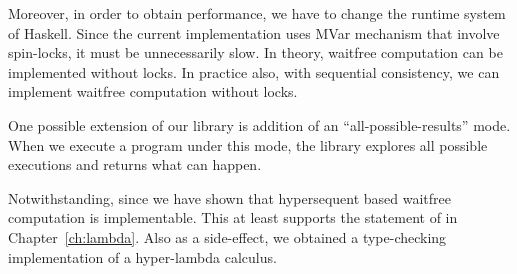 Moreover, in order to obtain performance, we have to change the runtime
system of Haskell.  Since the current implementation uses MVar mechanism
that involve spin-locks, it must be unnecessarily slow.  In theory, waitfree
computation can be implemented without locks.  In practice also, with
sequential consistency, we can implement waitfree computation without
locks.

One possible extension of our library is addition of an ``all-possible-results''
mode.  When we execute a program under this mode, the library explores
all possible executions and returns what can happen.

Notwithstanding, since we have shown that hypersequent based waitfree computation
is implementable.  This at least supports the statement of
 in Chapter~\ref{ch:lambda}.
Also as a side-effect, we obtained a type-checking implementation of a
hyper-lambda calculus.
